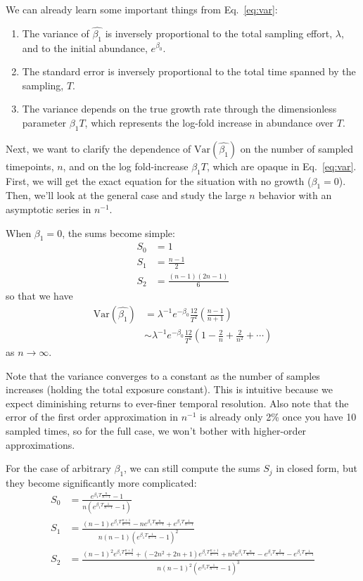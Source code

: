 \documentclass[12pt, letterpaper]{article}
\begin{document}
We can already learn some important things from Eq.~\ref{eq:var}:
\begin{enumerate}
    \item The variance of $\hat{\beta_1}$ is inversely proportional to the total sampling effort, $\lambda$, and to the initial abundance, $e^{\beta_0}$.
    \item The standard error is inversely proportional to the total time spanned by the sampling, $T$.
    \item The variance depends on the true growth rate through the dimensionless parameter $\beta_1 T$, which represents the log-fold increase in abundance over $T$.
\end{enumerate}

Next, we want to clarify the dependence of $\textrm{Var}(\hat{\beta_1})$ on the number of sampled timepoints, $n$, and on the log fold-increase $\beta_1 T$, which are opaque in Eq.~\ref{eq:var}.
First, we will get the exact equation for the situation with no growth ($\beta_1 = 0$).
Then, we'll look at the general case and study the large $n$ behavior with an asymptotic series in $n^{-1}$.

When $\beta_1 = 0$, the sums become simple:
\begin{align}
    S_0 &= 1 \\
    S_1 &= \frac{n-1}{2} \\
    S_2 &= \frac{(n-1)(2n-1)}{6}
\end{align}
so that we have
\begin{align}
    \textrm{Var}(\hat{\beta_1}) &= \lambda^{-1} e^{-\beta_0} \frac{12}{T^2} \left(\frac{n-1}{n+1}\right) \\
                                &\sim \lambda^{-1} e^{-\beta_0} \frac{12}{T^2} \left(1 - \frac{2}{n} + \frac{2}{n^2} + \cdots\right)
\end{align}
as $n \to \infty$.

Note that the variance converges to a constant as the number of samples increases (holding the total exposure constant).
This is intuitive because we expect diminishing returns to ever-finer temporal resolution.
Also note that the error of the first order approximation in $n^{-1}$ is already only 2\% once you have 10 sampled times, so for the full case, we won't bother with higher-order approximations.

\newcommand{\expnm}[1]{e^{\beta_1 T \frac{#1}{n-1}}}

For the case of arbitrary $\beta_1$, we can still compute the sums $S_j$ in closed form, but they become significantly more complicated:
\begin{align}
    S_0 &= \frac{\expnm{n} - 1}{n\left(\expnm{1} - 1\right)} \\
    S_1 &= \frac{(n-1) \expnm{n+1} - n\expnm{n} + \expnm{1}}{n(n-1){\left(\expnm{1}-1\right)}^2} \\
    S_2 &= \frac{{(n-1)}^2\expnm{n+2} + (-2n^2 + 2n + 1) \expnm{n+1} + n^2 \expnm{n} - \expnm{2} - \expnm{1}}{n{(n-1)}^2{\left(\expnm{1} - 1\right)}^3}
\end{align}
\end{document}
